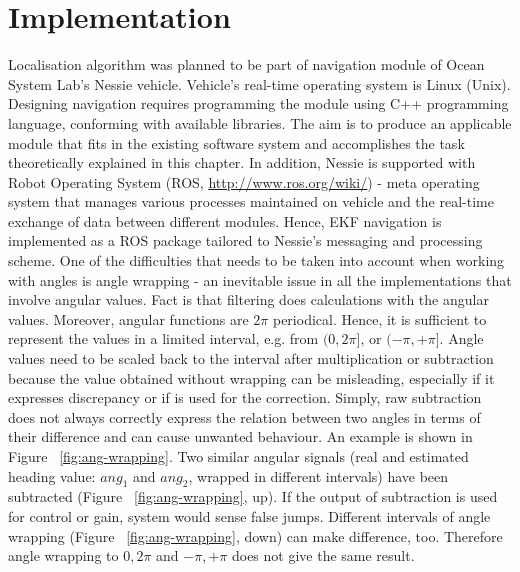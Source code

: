 \section{Implementation} \label{sec:implementation}
Localisation algorithm was planned to be part of navigation module of Ocean System Lab's Nessie vehicle. Vehicle's real-time operating system is Linux (Unix). Designing navigation requires programming the module using C++ programming language, conforming with available libraries. The aim is to produce an applicable module that fits in the existing software system and accomplishes the task theoretically explained in this chapter. In addition, Nessie is supported with Robot Operating System (ROS, \url{http://www.ros.org/wiki/}) - meta operating system that manages various processes maintained on vehicle and the real-time exchange of data between different modules. Hence, EKF navigation is implemented as a ROS package tailored to Nessie's messaging and processing scheme. One of the difficulties that needs to be taken into account when working with angles is angle wrapping - an inevitable issue in all the implementations that involve angular values. Fact is that filtering does calculations with the angular values. Moreover, angular functions are $2\pi$ periodical. Hence, it is sufficient to represent the values in a limited interval, e.g. from $(0,2\pi]$, or $(-\pi,+\pi]$. Angle values need to be scaled back to the interval after multiplication or subtraction because the value obtained without wrapping can be misleading, especially if it expresses discrepancy or if is used for the correction. Simply, raw subtraction does not always correctly express the relation between two angles in terms of their difference and can cause unwanted behaviour. An example is shown in Figure ~\ref{fig:ang-wrapping}. Two similar angular signals (real and estimated heading value: $ang_{1}$ and $ang_{2}$, wrapped in different intervals) have been subtracted (Figure ~\ref{fig:ang-wrapping}, up). If the output of subtraction is used for control or gain, system would sense false jumps. Different intervals of angle wrapping (Figure ~\ref{fig:ang-wrapping}, down) can make difference, too. Therefore angle wrapping to $0,2\pi$ and $-\pi,+\pi$ does not give the same result. 

